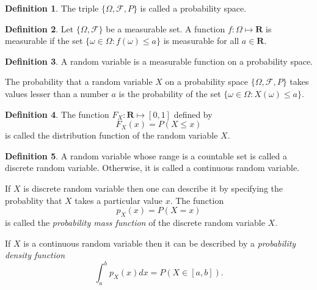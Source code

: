 \documentclass{article}
\numberwithin{equation}{section}
\theoremstyle{plain}
\numberwithin{thm}{section}
\theoremstyle{plain}
\numberwithin{prop}{section}
\theoremstyle{definition}
\newtheorem{defn}{Definition}
\numberwithin{defn}{section}
\theoremstyle{remark}
\begin{document}
\begin{defn}\label{s1d8}
The triple $\{\Omega, \mathcal{F}, P\}$ is called a probability space.
\end{defn}
\begin{defn}\label{s1d9}
Let $\{\Omega,\mathcal{F}\}$ be a measurable set. A function $f:\Omega \mapsto
\mathbf{R}$ is measurable if the set $\{\omega \in \Omega : f(\omega) \le a\}$ 
is measurable for all $a \in \mathbf{R}$.
\end{defn}
\begin{defn}\label{s1d10}
A random variable is a measurable function on a probability space.
\end{defn}
The probability that a random variable $X$ on a probability space $\{\Omega,
\mathcal{F}, P\}$ takes values lesser than a number $a$ is the probability of
the set $\{\omega \in \Omega: X(\omega) \le a\}$.

\begin{defn}\label{s1d11}
The function $F_X: \mathbf{R} \mapsto [0, 1]$ defined by
\[
F_X(x) = P(X \le x)
\]
is called the distribution function of the random variable $X$.
\end{defn}

\begin{defn}\label{s1d12}
A random variable whose range is a countable set is called a discrete
random variable. Otherwise, it is called a continuous random variable.
\end{defn}

If $X$ is discrete random variable then one can describe it by specifying the
probablity that $X$ takes a particular value $x$. The function
\begin{equation}\label{s1e1}
p_X(x) = P(X = x)
\end{equation}
is called the \emph{probability mass function} of the discrete random variable
$X$.

If $X$ is a continuous random variable then it can be described by a \emph{
probability density function} 
\begin{equation}\label{s1e2}
\int_a^b p_X(x)dx = P(X \in [a, b]).
\end{equation}
\end{document}
